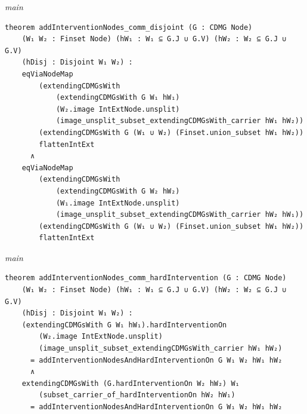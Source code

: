 {\small\textit{main}}
\begin{verbatim}
theorem addInterventionNodes_comm_disjoint (G : CDMG Node)
    (W₁ W₂ : Finset Node) (hW₁ : W₁ ⊆ G.J ∪ G.V) (hW₂ : W₂ ⊆ G.J ∪ G.V)
    (hDisj : Disjoint W₁ W₂) :
    eqViaNodeMap
        (extendingCDMGsWith
            (extendingCDMGsWith G W₁ hW₁)
            (W₂.image IntExtNode.unsplit)
            (image_unsplit_subset_extendingCDMGsWith_carrier hW₁ hW₂))
        (extendingCDMGsWith G (W₁ ∪ W₂) (Finset.union_subset hW₁ hW₂))
        flattenIntExt
      ∧
    eqViaNodeMap
        (extendingCDMGsWith
            (extendingCDMGsWith G W₂ hW₂)
            (W₁.image IntExtNode.unsplit)
            (image_unsplit_subset_extendingCDMGsWith_carrier hW₂ hW₁))
        (extendingCDMGsWith G (W₁ ∪ W₂) (Finset.union_subset hW₁ hW₂))
        flattenIntExt
\end{verbatim}
{\small\textit{main}}
\begin{verbatim}
theorem addInterventionNodes_comm_hardIntervention (G : CDMG Node)
    (W₁ W₂ : Finset Node) (hW₁ : W₁ ⊆ G.J ∪ G.V) (hW₂ : W₂ ⊆ G.J ∪ G.V)
    (hDisj : Disjoint W₁ W₂) :
    (extendingCDMGsWith G W₁ hW₁).hardInterventionOn
        (W₂.image IntExtNode.unsplit)
        (image_unsplit_subset_extendingCDMGsWith_carrier hW₁ hW₂)
      = addInterventionNodesAndHardInterventionOn G W₁ W₂ hW₁ hW₂
      ∧
    extendingCDMGsWith (G.hardInterventionOn W₂ hW₂) W₁
        (subset_carrier_of_hardInterventionOn hW₂ hW₁)
      = addInterventionNodesAndHardInterventionOn G W₁ W₂ hW₁ hW₂
\end{verbatim}
~%

\vspace{\appendixNotesGap}

